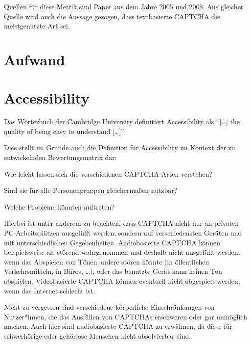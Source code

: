Quellen für diese Metrik sind Paper aus dem Jahre 2005 und 2008. 
Aus gleicher Quelle wird auch die Aussage gezogen, dass textbasierte CAPTCHA die meistgenutzte Art sei. 


\section{Aufwand}
\label{ch:matrix:aufwand}


\section{Accessibility}
\label{ch:matrix:accessibility}
Das Wörterbuch der Cambridge University definitiert Accessibility als ``$[$\dots$]$ the quality of being easy to understand $[$\dots$]$'' \cite{CACD:2008}

Dies stellt im Grunde auch die Definition für Accessibility im Kontext der zu entwickelnden Bewertungsmatrix dar: 

Wie leicht lassen sich die verschiedenen CAPTCHA-Arten verstehen? 

Sind sie für alle Personengruppen gleichermaßen nutzbar? 

Welche Probleme könnten auftreten?

Hierbei ist unter anderem zu beachten, dass CAPTCHA nicht nur an privaten PC-Arbeitsplätzen ausgefüllt werden, 
sondern auf verschiedensten Geräten und mit unterschiedlichen Gegebenheiten. 
Audiobasierte CAPTCHA können beispielsweise als störend wahrgenommen und deshalb nicht ausgefüllt werden, 
wenn das Abspielen von Tönen andere stören könnte $($in öffentlichen Verkehrsmitteln, in Büros, \dots$)$, 
oder das benutzte Gerät kann keinen Ton abspielen. Videobasierte CAPTCHA können eventuell nicht abgespielt werden, 
wenn das Internet schlecht ist.

Nicht zu vergessen sind verschiedene körperliche Einschränkungen von Nutzer*innen, 
die das Ausfüllen von CAPTCHAs erschweren oder gar unmöglich machen. Auch hier sind audiobasierte CAPTCHA zu erwähnen, 
da diese für schwerhörige oder gehörlose Menschen nicht absolvierbar sind. 


